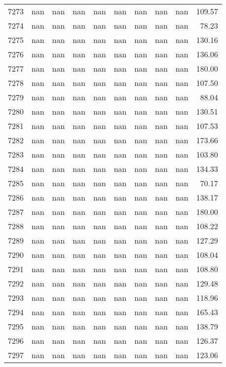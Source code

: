 \begin{tabular}{lrrrrrrrrr}
7273 & nan & nan & nan & nan & nan & nan & nan & nan & 109.57 \\
7274 & nan & nan & nan & nan & nan & nan & nan & nan & 78.23 \\
7275 & nan & nan & nan & nan & nan & nan & nan & nan & 130.16 \\
7276 & nan & nan & nan & nan & nan & nan & nan & nan & 136.06 \\
7277 & nan & nan & nan & nan & nan & nan & nan & nan & 180.00 \\
7278 & nan & nan & nan & nan & nan & nan & nan & nan & 107.50 \\
7279 & nan & nan & nan & nan & nan & nan & nan & nan & 88.04 \\
7280 & nan & nan & nan & nan & nan & nan & nan & nan & 130.51 \\
7281 & nan & nan & nan & nan & nan & nan & nan & nan & 107.53 \\
7282 & nan & nan & nan & nan & nan & nan & nan & nan & 173.66 \\
7283 & nan & nan & nan & nan & nan & nan & nan & nan & 103.80 \\
7284 & nan & nan & nan & nan & nan & nan & nan & nan & 134.33 \\
7285 & nan & nan & nan & nan & nan & nan & nan & nan & 70.17 \\
7286 & nan & nan & nan & nan & nan & nan & nan & nan & 138.17 \\
7287 & nan & nan & nan & nan & nan & nan & nan & nan & 180.00 \\
7288 & nan & nan & nan & nan & nan & nan & nan & nan & 108.22 \\
7289 & nan & nan & nan & nan & nan & nan & nan & nan & 127.29 \\
7290 & nan & nan & nan & nan & nan & nan & nan & nan & 108.04 \\
7291 & nan & nan & nan & nan & nan & nan & nan & nan & 108.80 \\
7292 & nan & nan & nan & nan & nan & nan & nan & nan & 129.48 \\
7293 & nan & nan & nan & nan & nan & nan & nan & nan & 118.96 \\
7294 & nan & nan & nan & nan & nan & nan & nan & nan & 165.43 \\
7295 & nan & nan & nan & nan & nan & nan & nan & nan & 138.79 \\
7296 & nan & nan & nan & nan & nan & nan & nan & nan & 126.37 \\
7297 & nan & nan & nan & nan & nan & nan & nan & nan & 123.06 \\

\end{tabular}
